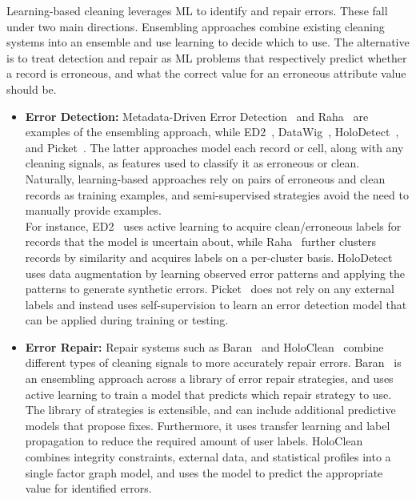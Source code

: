 \documentclass[11pt,dvipsnames]{article}
\begin{document}
Learning-based cleaning leverages ML to identify and repair errors.  These fall under two main directions. Ensembling approaches combine existing cleaning systems into an ensemble and use learning to decide which to use.   The alternative is to treat detection and repair as ML problems that respectively  predict whether a record is erroneous, and what the correct value for an erroneous attribute value should be.  
\vspace{3mm}
\begin{itemize}[leftmargin=*]
  \item \textbf{Error Detection: } Metadata-Driven Error Detection~\cite{MetadataDriven} and Raha~\cite{Raha} are examples of the ensembling approach, while  ED2~\cite{ED2}, DataWig~\cite{Imputation, DataWig}, HoloDetect~\cite{HoloDetect}, and Picket~\cite{Picket}.
The latter approaches model each record or cell, along with any cleaning signals, as features used to classify it as erroneous or clean.  
Naturally, learning-based approaches rely on pairs of erroneous and clean records as training examples, and semi-supervised strategies avoid the need to manually provide examples. \\

For instance, ED2~\cite{ED2} uses active learning to acquire clean/erroneous labels for records that the model is uncertain about, while Raha~\cite{Raha} further clusters records by similarity and acquires labels on a per-cluster basis.  HoloDetect~\cite{HoloDetect} uses data augmentation by learning observed error patterns and applying the patterns to generate synthetic errors.
Picket~\cite{Picket} does not rely on any external labels and instead uses self-supervision to learn an error detection model that can be applied during training or testing.  

\vspace{3mm}
\item \textbf{Error Repair: }
Repair systems such as Baran~\cite{Baran} and HoloClean~\cite{HoloClean}   combine different types of cleaning signals to more accurately repair errors.  
Baran~\cite{Baran} is an ensembling approach across a library of error repair strategies, and uses active learning to train a model that predicts which repair strategy to use.  The library of strategies is extensible, and can include additional predictive models that propose fixes. Furthermore, it uses transfer learning and label propagation to reduce the required amount of user labels.
HoloClean~\cite{HoloClean} combines integrity constraints, external data, and statistical profiles into a single factor graph model, and uses the model to predict the appropriate value for identified errors. 
\end{itemize}
\end{document}
